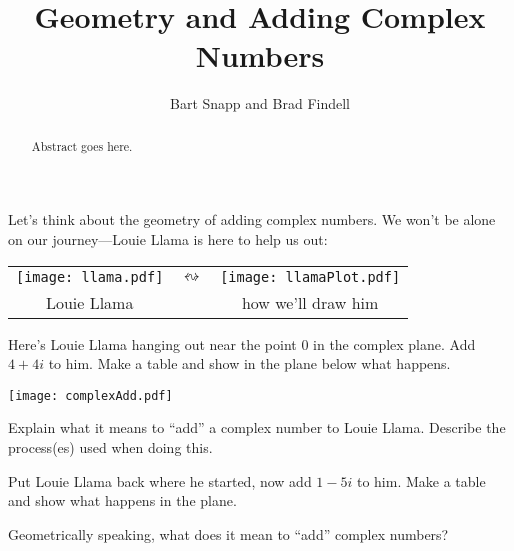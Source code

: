 \documentclass{ximera}
\title{Geometry and Adding Complex Numbers}
\author{Bart Snapp and Brad Findell}
\begin{document}
\begin{abstract}
Abstract goes here.  
\end{abstract}
\maketitle

\label{A:complexAddition}


Let's think about the geometry of adding complex numbers. We won't be
alone on our journey---Louie Llama is here to help
us out:
\begin{image}
\begin{tabular}{ccc}
\texttt{[image: llama.pdf]} & 
\qquad $\leftrightsquigarrow$\qquad & 
\texttt{[image: llamaPlot.pdf]}\\
Louie Llama & & how we'll draw him
\end{tabular}
\end{image}

\begin{problem} 
Here's Louie Llama hanging out near the point $0$ in the complex
plane. Add $4+4i$ to him. Make a table and show in the plane below what happens.
\begin{image}
\texttt{[image: complexAdd.pdf]}
\end{image}
\end{problem}

\begin{problem}
Explain what it means to ``add'' a complex number to Louie
Llama. Describe the process(es) used when doing this.
\end{problem}


\begin{problem} 
Put Louie Llama back where he started, now add $1-5i$ to him.  Make a
table and show what happens in the plane.
\end{problem}


\begin{problem} 
Geometrically speaking, what does it mean to ``add'' complex numbers?
\end{problem}
\end{document}
